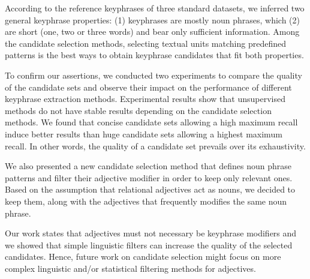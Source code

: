   According to the reference keyphrases of three standard datasets, we inferred
  two general keyphrase properties: (1) keyphrases are mostly noun phrases,
  which (2) are short (one, two or three words) and bear only sufficient
  information. Among the candidate selection methods, selecting textual units
  matching predefined patterns is the best ways to obtain keyphrase candidates
  that fit both properties.

  To confirm our assertions, we conducted two experiments to compare the quality
  of the candidate sets and observe their impact on the performance of different
  keyphrase extraction methods. Experimental results show that unsupervised
  methods do not have stable results depending on the candidate selection
  methods. We found that concise candidate sets allowing a high maximum recall
  induce better results than huge candidate sets allowing a highest maximum
  recall. In other words, the quality of a candidate set prevails over its
  exhaustivity.

  We also presented a new candidate selection method that defines noun phrase
  patterns and filter their adjective modifier in order to keep only relevant
  ones. Based on the assumption that relational adjectives act as nouns, we
  decided to keep them, along with the adjectives that frequently modifies the
  same noun phrase.

  Our work states that adjectives must not necessary be keyphrase modifiers and
  we showed that simple linguistic filters can increase the quality of the
  selected candidates. Hence, future work on candidate selection might focus on
  more complex linguistic and/or statistical filtering methods for adjectives.


